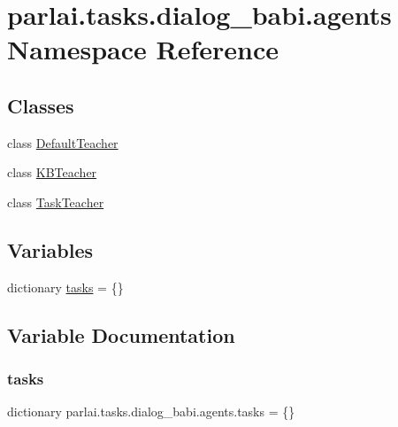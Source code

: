 \hypertarget{namespaceparlai_1_1tasks_1_1dialog__babi_1_1agents}{}\section{parlai.\+tasks.\+dialog\+\_\+babi.\+agents Namespace Reference}
\label{namespaceparlai_1_1tasks_1_1dialog__babi_1_1agents}
\subsection*{Classes}
\begin{DoxyCompactItemize}
\item 
class \hyperlink{classparlai_1_1tasks_1_1dialog__babi_1_1agents_1_1DefaultTeacher}{Default\+Teacher}
\item 
class \hyperlink{classparlai_1_1tasks_1_1dialog__babi_1_1agents_1_1KBTeacher}{K\+B\+Teacher}
\item 
class \hyperlink{classparlai_1_1tasks_1_1dialog__babi_1_1agents_1_1TaskTeacher}{Task\+Teacher}
\end{DoxyCompactItemize}
\subsection*{Variables}
\begin{DoxyCompactItemize}
\item 
dictionary \hyperlink{namespaceparlai_1_1tasks_1_1dialog__babi_1_1agents_a0cc1b4db6e2dd7227c0553805fb92e01}{tasks} = \{\}
\end{DoxyCompactItemize}


\subsection{Variable Documentation}
\mbox{\label{namespaceparlai_1_1tasks_1_1dialog__babi_1_1agents_a0cc1b4db6e2dd7227c0553805fb92e01}} 
\subsubsection{\texorpdfstring{tasks}{tasks}}
{\footnotesize\ttfamily dictionary parlai.\+tasks.\+dialog\+\_\+babi.\+agents.\+tasks = \{\}}


